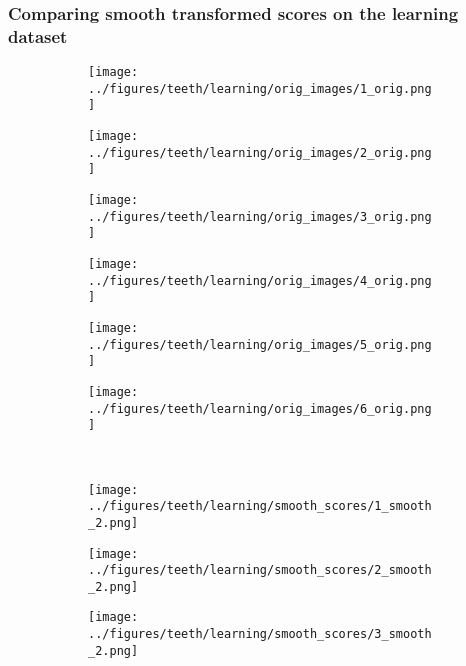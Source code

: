 \subsubsection{Comparing smooth transformed scores on the learning dataset}\label{teethlearnorig2}
\begin{figure}[h!]
	\begin{subfigure}{0.16\textwidth}
		\centering
		\texttt{[image: ../figures/teeth/learning/orig\_images/1\_orig.png]}
		\label{fig:1}
	\end{subfigure}
	\begin{subfigure}{0.16\textwidth}
		\centering
		\texttt{[image: ../figures/teeth/learning/orig\_images/2\_orig.png]}
		\label{fig:1}
	\end{subfigure}
	\begin{subfigure}{0.16\textwidth}
		\centering
		\texttt{[image: ../figures/teeth/learning/orig\_images/3\_orig.png]}
		\label{fig:1}
	\end{subfigure}
	\begin{subfigure}{0.16\textwidth}
		\centering
		\texttt{[image: ../figures/teeth/learning/orig\_images/4\_orig.png]}
		\label{fig:1}
	\end{subfigure}
	\begin{subfigure}{0.16\textwidth}
		\centering
		\texttt{[image: ../figures/teeth/learning/orig\_images/5\_orig.png]}
		\label{fig:1}
	\end{subfigure}
	\begin{subfigure}{0.16\textwidth}
		\centering
		\texttt{[image: ../figures/teeth/learning/orig\_images/6\_orig.png]}
		\label{fig:1}
	\end{subfigure}
	\vspace{-0.35cm}
	\\
	\begin{subfigure}{0.16\textwidth}
		\centering
		\texttt{[image: ../figures/teeth/learning/smooth\_scores/1\_smooth\_2.png]}
		\label{fig:1}
	\end{subfigure}
	\begin{subfigure}{0.16\textwidth}
		\centering
		\texttt{[image: ../figures/teeth/learning/smooth\_scores/2\_smooth\_2.png]}
		\label{fig:1}
	\end{subfigure}
	\begin{subfigure}{0.16\textwidth}
		\centering
		\texttt{[image: ../figures/teeth/learning/smooth\_scores/3\_smooth\_2.png]}
		\label{fig:1}

\end{subfigure}
\end{figure}
